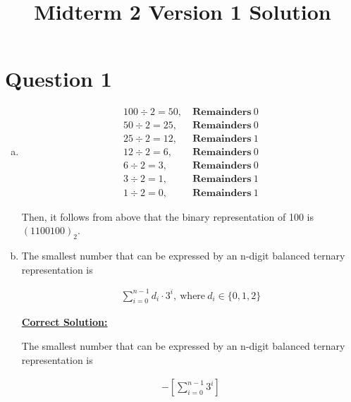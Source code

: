 \documentclass[12pt]{article}
\begin{document}
\title{Midterm 2 Version 1 Solution}
\maketitle

\section*{Question 1}
\begin{enumerate}[a.]
    \item

    \begin{align*}
        100 \div 2 = 50,\:&\textbf{Remainders}\:0\\
        50 \div 2 = 25,\:&\textbf{Remainders}\:0\\
        25 \div 2 = 12,\:&\textbf{Remainders}\:1\\
        12 \div 2 = 6,\:&\textbf{Remainders}\:0\\
        6 \div 2 = 3,\:&\textbf{Remainders}\:0\\
        3 \div 2 = 1,\:&\textbf{Remainders}\:1\\
        1 \div 2 = 0,\:&\textbf{Remainders}\:1
    \end{align*}

    \bigskip

    Then, it follows from above that the binary representation of 100 is $(1100100)_2$.

    \item

    The smallest number that can be expressed by an n-digit balanced ternary
    representation is

    \begin{align}
        \sum\limits_{i=0}^{n-1} d_i \cdot 3^i,\:\text{where}\:d_i \in \{0,1,2\}
    \end{align}

    \bigskip

    \begin{mdframed}
        \underline{\textbf{Correct Solution:}}

        \bigskip

        The smallest number that can be expressed by an n-digit balanced ternary
        representation is

        \begin{align}
            -\left[ \sum\limits_{i=0}^{n-1} 3^i \right]
        \end{align}
    \end{mdframed}


\end{enumerate}
\end{document}

